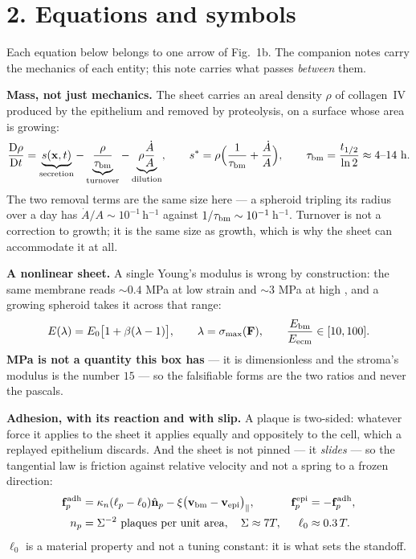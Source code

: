 \documentclass[10pt,a4paper]{article}
\begin{document}
\section*{2.\; Equations and symbols}

Each equation below belongs to one arrow of Fig.~1b. The companion notes carry the mechanics of each
entity; this note carries what passes \emph{between} them.

\textbf{Mass, not just mechanics.} The sheet carries an areal density $\rho$ of collagen~IV produced by
the epithelium and removed by proteolysis, on a surface whose area is growing:
%
\begin{equation}
\frac{\mathrm D\rho}{\mathrm Dt}
=\underbrace{s(\mathbf x,t)}_{\text{secretion}}
-\underbrace{\frac{\rho}{\tau_{\rm bm}}}_{\text{turnover}}
-\underbrace{\rho\frac{\dot A}{A}}_{\text{dilution}},
\qquad
s^\ast=\rho\Bigl(\frac1{\tau_{\rm bm}}+\frac{\dot A}{A}\Bigr),
\qquad \tau_{\rm bm}=\frac{t_{1/2}}{\ln2}\approx4\text{--}14\ \text{h}.
\label{eq:bmmass}
\end{equation}
%
The two removal terms are the same size here --- a spheroid tripling its radius over a day has
$\dot A/A\sim10^{-1}\,$h$^{-1}$ against $1/\tau_{\rm bm}\sim10^{-1}\,$h$^{-1}$. Turnover is not a
correction to growth; it is the same size as growth, which is why the sheet can accommodate it at all.

\textbf{A nonlinear sheet.} A single Young's modulus is wrong by construction: the same membrane reads
$\sim\!0.4$ MPa at low strain and $\sim\!3$ MPa at high \cite{candiello2007}, and a growing spheroid
takes it across that range:
%
\begin{equation}
E(\lambda)=E_0\bigl[1+\beta(\lambda-1)\bigr],\qquad
\lambda=\sigma_{\max}(\mathbf F),\qquad
\frac{E_{\rm bm}}{E_{\rm ecm}}\in[10,100].
\label{eq:bmstiff}
\end{equation}
%
\textbf{MPa is not a quantity this box has} --- it is dimensionless and the stroma's modulus is the
number $15$ --- so the falsifiable forms are the two ratios and never the pascals.

\textbf{Adhesion, with its reaction and with slip.} A plaque is two-sided: whatever force it applies to
the sheet it applies equally and oppositely to the cell, which a replayed epithelium discards. And the
sheet is not pinned --- it \emph{slides} --- so the tangential law is friction against relative
velocity and not a spring to a frozen direction:
%
\begin{align}
\mathbf f^{\rm adh}_p&=\kappa_n(\ell_p-\ell_0)\hat{\mathbf n}_p
 -\xi\bigl(\mathbf v_{\rm bm}-\mathbf v_{\rm epi}\bigr)_{\parallel},
&\mathbf f^{\rm epi}_p&=-\mathbf f^{\rm adh}_p,
\label{eq:adh}\\
n_p&=\Sigma^{-2}\ \text{plaques per unit area},\quad \Sigma\approx7T,
&\ell_0&\approx0.3\,T .
\label{eq:plaque}
\end{align}
%
$\ell_0$ is a material property and not a tuning constant: it is what sets the standoff.
\end{document}
